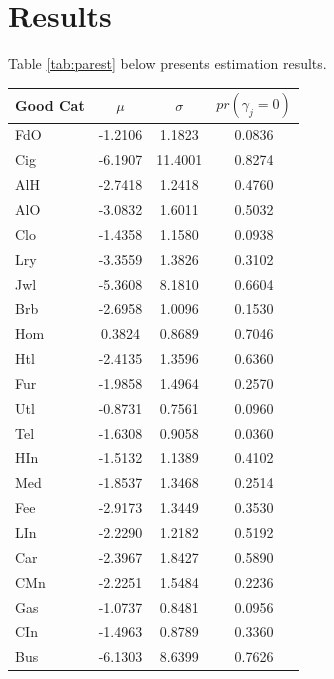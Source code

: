 \documentclass{article}
\begin{document}
\section{Results}
Table \ref{tab:parest} below presents estimation results.  
\begin{table}
	\begin{center}
		\begin{tabular}{|l|c|c|c|}
			\hline
			Good Cat & $\mu$ & $\sigma$ & $pr(\gamma_j =  0)$\\
			\hline
			FdO & -1.2106 &    1.1823 &    0.0836\\ 
                        \hline
			Cig & -6.1907 &   11.4001 &    0.8274\\ 
			\hline
			AlH & -2.7418 &    1.2418 &    0.4760\\ 
			\hline
			AlO & -3.0832 &    1.6011 &    0.5032\\ 
			\hline
			Clo & -1.4358 &    1.1580 &    0.0938\\ 
			\hline
			Lry & -3.3559 &    1.3826 &    0.3102\\ 
			\hline
			Jwl & -5.3608 &    8.1810 &    0.6604\\ 
			\hline
			Brb & -2.6958 &    1.0096 &    0.1530\\ 
			\hline
			Hom &  0.3824 &    0.8689 &    0.7046\\ 
			\hline
			Htl & -2.4135 &    1.3596 &    0.6360\\ 
			\hline
			Fur & -1.9858 &    1.4964 &    0.2570\\ 
			\hline
			Utl & -0.8731 &    0.7561 &    0.0960\\ 
			\hline
			Tel & -1.6308 &    0.9058 &    0.0360\\ 
			\hline
			HIn & -1.5132 &    1.1389 &    0.4102\\ 
			\hline
			Med & -1.8537 &    1.3468 &    0.2514\\ 
			\hline
			Fee & -2.9173 &    1.3449 &    0.3530\\ 
			\hline
			LIn & -2.2290 &    1.2182 &    0.5192\\ 
			\hline
			Car & -2.3967 &    1.8427 &    0.5890\\ 
			\hline
			CMn & -2.2251 &    1.5484 &    0.2236\\ 
			\hline
			Gas & -1.0737 &    0.8481 &    0.0956\\ 
			\hline
			CIn & -1.4963 &    0.8789 &    0.3360\\ 
			\hline
			Bus & -6.1303 &    8.6399 &    0.7626\\ 

\end{tabular}
\end{center}
\end{table}
\end{document}
